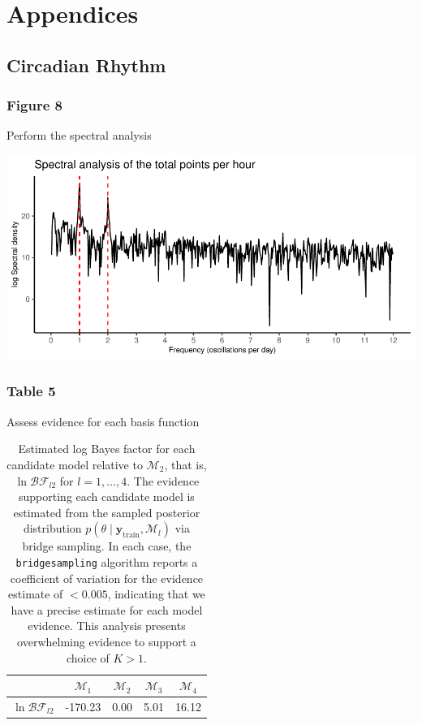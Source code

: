 \documentclass[
]{article}
\begin{document}
\hypertarget{appendices}{%
\section{Appendices}\label{appendices}}

\hypertarget{circadian-rhythm}{%
\subsection{Circadian Rhythm}\label{circadian-rhythm}}

\hypertarget{figure-8}{%
\subsubsection{Figure 8}\label{figure-8}}

Perform the spectral analysis

\includegraphics{figures_and_tables_files/figure-latex/count_spectral_density-1.pdf}

\hypertarget{table-5}{%
\subsubsection{Table 5}\label{table-5}}

Assess evidence for each basis function

\begin{table}[ht]
\centering
\begin{tabular}{|l|c|c|c|c|}
  \hline
 & $\mathcal {M}_1$ & $\mathcal {M}_2$ & $\mathcal {M}_3$ & $\mathcal {M}_4$ \\ 
  \hline
$\ln \mathcal{BF}_{l2}$ & -170.23 & 0.00 & 5.01 & 16.12 \\ 
   \hline
\end{tabular}
\caption{Estimated log Bayes factor for each candidate model relative to $\mathcal M_2$, that is, $\ln \mathcal{BF}_{l2}$ for $l = 1, \dots, 4$. The evidence supporting each candidate model is estimated from the sampled posterior distribution $p \left( \theta \mid \boldsymbol y_{\operatorname{train}}, \mathcal M_l \right)$ via bridge sampling. In each case, the \texttt{bridgesampling} algorithm reports a coefficient of variation for the evidence estimate of $<0.005$, indicating that we have a precise estimate for each model evidence. This analysis presents overwhelming evidence to support a choice of $K > 1$.} 
\label{tab:freq_bf_estimates}
\end{table}
\end{document}
